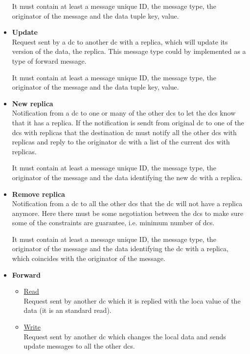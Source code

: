 \documentclass[english]{article}
\begin{document}
\begin{itemize}
	It must contain at least  a message unique ID, the message type, the originator of the message and the data tuple key, value.

	\item {\bf Update}\\
	Request sent by a \gls{dc} to another \gls{dc} with a replica, which will update its version of the data, the replica. This message type could by implemented as a type of forward message.

	It must contain at least  a message unique ID, the message type, the originator of the message and the data tuple key, value.

	\item {\bf New replica}\\
	Notification from a \gls{dc} to one or many of the other \glspl{dc} to let the \glspl{dc} know that it has a replica. If the notification is sendt from original \gls{dc} to one of the \glspl{dc} with replicas that the destination \gls{dc} must notify all the other \glspl{dc} with replicas and reply to the originator \gls{dc} with a list of the current \glspl{dc} with replicas.
	
	It must contain at least  a message unique ID, the message type, the originator of the message and the data identifying the new \gls{dc} with a replica.

	\item {\bf Remove replica}\\
	Notification from a \gls{dc} to all the other \glspl{dc} that the \gls{dc} will not have a replica anymore. Here there must be some negotiation between the \glspl{dc} to make sure some of the constraints are guarantee, i.e. minimum number of \glspl{dc}.

	It must contain at least  a message unique ID, the message type, the originator of the message and the data identifying the \gls{dc} with a replica, which coincides with the originator of the message.

	\item {\bf Forward}
		\begin{itemize}
			\item \underline{Read}\\
			Request sent by another \gls{dc} which it is replied with the loca value of the data (it is an standard read).

			\item \underline{Write}\\
			Request sent by another \gls{dc} which changes the local data and sends update messages to all the other \glspl{dc}.
		\end{itemize}


\end{itemize}
\end{document}
